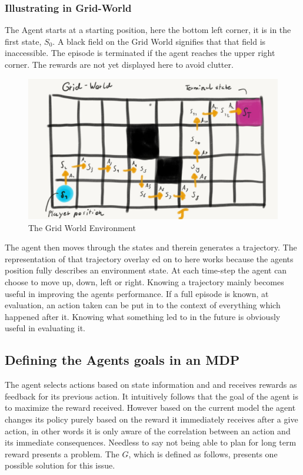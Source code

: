 \subsubsection{Illustrating in Grid-World}\label{subsubsec:grid_world_trajectory}
The Agent starts at a starting position, here the bottom left corner, it is in the first state, $S_0$. A black field on the Grid World signifies that that field is inaccessible. The episode is terminated if the agent reaches the upper right corner. The rewards are not yet displayed here to avoid clutter.

\begin{figure}[h!]
    \centering
    \includegraphics[width=0.7\linewidth]{figures/Grid_world_trajectory.jpeg}
    \caption{The Grid World Environment}
    \label{fig:grid_world}
\end{figure}

The agent then moves through the states and therein generates a trajectory. The representation of that trajectory overlay ed on to here works because the agents position fully describes an environment state. At each time-step the agent can choose to move up, down, left or right. Knowing a trajectory mainly becomes useful in improving the agents performance. If a full episode is known, at evaluation, an action taken can be put in to the context of everything which happened after it. Knowing what something led to in the future is obviously useful in evaluating it.

\subsection{Defining the Agents goals in an MDP}\label{subsec:goals}

The agent selects actions based on state information and and receives rewards as feedback for its previous action. It intuitively follows that the goal of the agent is to maximize the reward received. However based on the current model the agent changes its policy purely based on the reward it immediately receives after a give action, in other words it is only aware of the correlation between an action and its immediate consequences. Needless to say not being able to plan for long term reward presents a problem. The  $G$, which is defined as follows, presents one possible solution for this issue.

